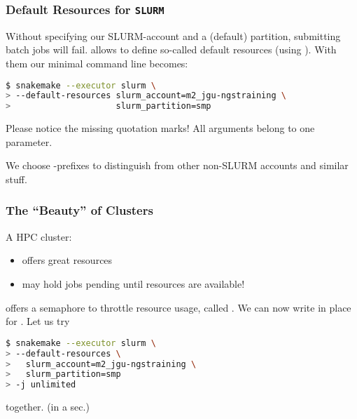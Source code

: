 \begin{frame}[fragile]
  \frametitle{Default Resources for \texttt{SLURM}}
  Without specifying our SLURM-account and a (default) partition, submitting batch jobs will fail. \Snakemake{} allows to define so-called default resources (using ). With them our minimal command line becomes:
  \begin{lstlisting}[language=Bash, style=Shell, basicstyle=\footnotesize]
$ snakemake --executor slurm \
> --default-resources slurm_account=m2_jgu-ngstraining \
>                     slurm_partition=smp
  \end{lstlisting}
  \begin{hint}
  	Please notice the missing quotation marks! All arguments belong to one parameter.
  \end{hint}
  \begin{docs}
  	We choose -prefixes to distinguish from other non-SLURM accounts and similar stuff.
  \end{docs}
\end{frame}

\begin{frame}[fragile]
  \frametitle{The ``Beauty'' of Clusters}
  A HPC cluster:
  \begin{itemize}
   \item offers great resources
   \item may hold jobs pending until resources are available!
  \end{itemize}
  \pause
  \Snakemake{} offers a semaphore to throttle resource usage, called . We can now write  in place for . Let us try
  \begin{lstlisting}[language=Bash, style=Shell, basicstyle=\footnotesize]
$ snakemake --executor slurm \
> --default-resources \ 
>   slurm_account=m2_jgu-ngstraining \
>   slurm_partition=smp
> -j unlimited
  \end{lstlisting}
  together. (in a sec.)
\end{frame}

